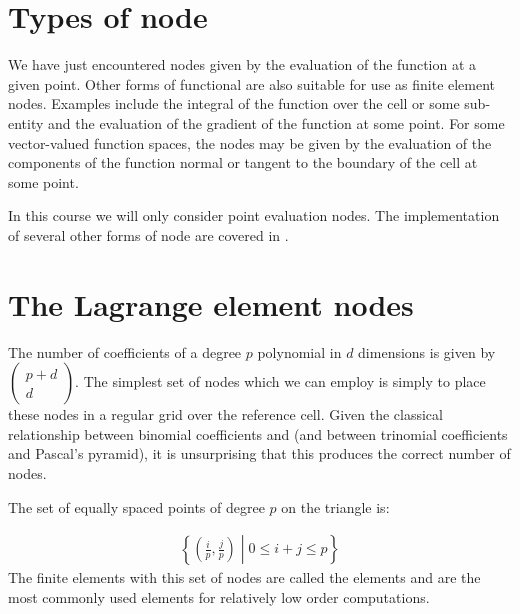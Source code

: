 \documentclass{book}
\begin{document}
\section{Types of node}
\label{\detokenize{2_finite_elements:types-of-node}}
We have just encountered nodes given by the evaluation of the function
at a given point. Other forms of functional are also suitable for use
as finite element nodes. Examples include the integral of the function
over the cell or some sub-entity and the evaluation of the gradient
of the function at some point. For some vector-valued function spaces,
the nodes may be given by the evaluation of the components of the
function normal or tangent to the boundary of the cell at some point.

In this course we will only consider point evaluation nodes. The implementation of several other forms of node are covered in \label{\detokenize{2_finite_elements:id2}}{\hyperref[\detokenize{zbibliography:kirby2004}]{\sphinxcrossref{{[}Kir04{]}}}}.


\section{The Lagrange element nodes}
\label{\detokenize{2_finite_elements:the-lagrange-element-nodes}}
The number of coefficients of a degree \(p\) polynomial in \(d\)
dimensions is given by \(\begin{pmatrix}p+d\\ d\end{pmatrix}\). The
simplest set of nodes which we can employ is simply to place these
nodes in a regular grid over the reference cell. Given the classical
relationship between binomial coefficients and  (and between
trinomial coefficients and Pascal’s pyramid), it is unsurprising that
this produces the correct number of nodes.

The set of equally spaced points of degree \(p\) on the triangle is:

\label{\detokenize{2_finite_elements:equation-lattice}}\begin{equation}\label{equation:2_finite_elements:lattice}
\begin{split}\left\{\left(\frac{i}{p}, \frac{j}{p}\right)\middle| 0 \leq i+j \leq p\right\}\end{split}
\end{equation}
The finite elements with this set of nodes are called the  elements and are the most commonly used elements for
relatively low order computations.
\end{document}
